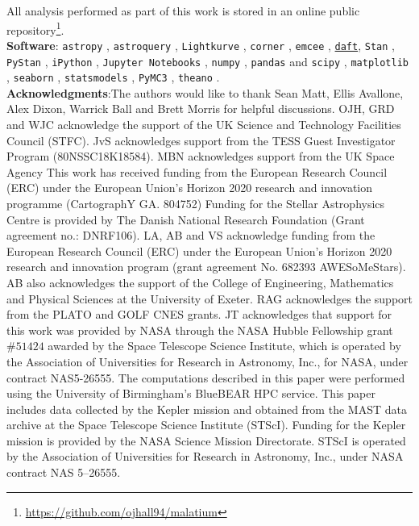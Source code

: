 \documentclass[12pt]{article}
\begin{document}
All analysis performed as part of this work is stored in an online public repository\footnote{\url{https://github.com/ojhall94/malatium}}.\\

\textbf{Software}: \texttt{astropy} \cite{astropycollaboration+2013, astropycollaboration+2018}, \texttt{astroquery} \cite{ginsburg+2019}, \texttt{Lightkurve} \cite{lightkurvecollaboration+2018}, \texttt{corner} \cite{foreman-mackey2016}, \texttt{emcee} \cite{foreman-mackey+2013}, \href{https://docs.daft-pgm.org/}{\texttt{daft}}, \texttt{Stan} \cite{carpenter+2017}, \texttt{PyStan} \cite{vanhoey+2013}, \texttt{iPython} \cite{perez+granger2007}, \texttt{Jupyter Notebooks} \cite{kluyver+2016}, \texttt{numpy}  \cite{vanderwalt+2011}, \texttt{pandas} and \texttt{scipy} \cite{mckinney2010}, \texttt{matplotlib} \cite{hunter2007}, \texttt{seaborn} \cite{waskom+2018}, \texttt{statsmodels} \cite{seabold+perktold2010}, \texttt{PyMC3} \cite{salvatier+2016}, \texttt{theano} \cite{thetheanodevelopmentteam+2016}.\\

\textbf{Acknowledgments}:The authors would like to thank Sean Matt, Ellis Avallone, Alex Dixon, Warrick Ball and Brett Morris for helpful discussions. 
OJH, GRD and WJC acknowledge the support of the UK Science and Technology Facilities Council (STFC). 
JvS acknowledges support from the TESS Guest Investigator Program (80NSSC18K18584).
MBN acknowledges support from the UK Space Agency
This work has received funding from the European Research Council (ERC) under the European Union's Horizon 2020 research and innovation programme (CartographY GA. 804752)
Funding for the Stellar Astrophysics Centre is provided by The Danish National Research Foundation (Grant agreement no.: DNRF106). 
LA, AB and VS acknowledge funding from the European Research Council (ERC) under the European Union's Horizon 2020 research and innovation program (grant agreement No. 682393 AWESoMeStars). AB also acknowledges the support of the College of Engineering, Mathematics and Physical Sciences at the University of Exeter.
RAG acknowledges the support from the PLATO and GOLF CNES grants.
JT acknowledges that support for this work was provided by NASA through the NASA Hubble Fellowship grant $\#51424$ awarded by the Space Telescope Science Institute, which is operated by the Association of Universities for Research in Astronomy, Inc., for NASA, under contract NAS5-26555.
The computations described in this paper were performed using the University of Birmingham's BlueBEAR HPC service.
This paper includes data collected by the Kepler mission and obtained from the MAST data archive at the Space Telescope Science Institute (STScI). Funding for the Kepler mission is provided by the NASA Science Mission Directorate. STScI is operated by the Association of Universities for Research in Astronomy, Inc., under NASA contract NAS 5–26555.\\
\end{document}
